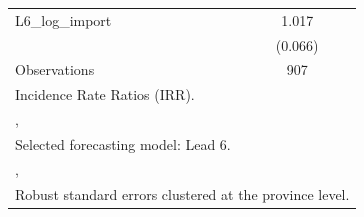 {\begin{tabular}{l*{1}{c}}
\addlinespace
L6\_log\_import   &    1.017         \\
                &  (0.066)         \\
\midrule
Observations    &      907         \\
\bottomrule
\multicolumn{2}{l}{\footnotesize Incidence Rate Ratios (IRR).}\\
\multicolumn{2}{l}{\footnotesize ,}\\
\multicolumn{2}{l}{\footnotesize Selected forecasting model: Lead 6.}\\
\multicolumn{2}{l}{\footnotesize ,}\\
\multicolumn{2}{l}{\footnotesize Robust standard errors clustered at the province level.}\\
\end{tabular}
}
